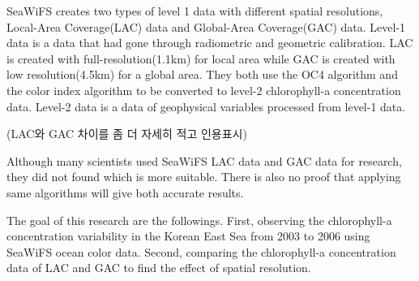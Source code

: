 SeaWiFS creates two types of level 1 data with different spatial resolutions, Local-Area Coverage(LAC) data and Global-Area Coverage(GAC) data. Level-1 data is a data that had gone through radiometric and geometric calibration. LAC is created with full-resolution(1.1km) for local area while GAC is created with low resolution(4.5km) for a global area. They both use the OC4 algorithm and the color index algorithm to be converted to level-2 chlorophyll-a concentration data. Level-2 data is a data of geophysical variables processed from level-1 data. 

(LAC와 GAC 차이를 좀 더 자세히 적고 인용표시)

Although many scientists used SeaWiFS LAC data and GAC data for research, they did not found which is more suitable. There is also no proof that applying same algorithms will give both accurate results. 

The goal of this research are the followings. First, observing the chlorophyll-a concentration variability in the Korean East Sea from 2003 to 2006 using SeaWiFS ocean color data. Second, comparing the chlorophyll-a concentration data of LAC and GAC to find the effect of spatial resolution.

